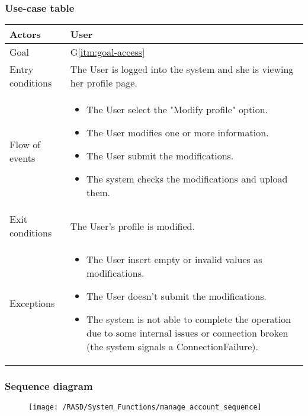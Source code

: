 \subsubsection{Use-case table}
\begin{center}
  \begin{tabular}{ l | p{10cm} }
    \hline
    Actors & User\\ \hline
    Goal & G\ref{itm:goal-access}\\ \hline
    Entry conditions & The User is logged into the system and she is viewing her profile page.   
    \\ \hline
    Flow of events &
      \begin{itemize}
        \item The User select the "Modify profile" option.
        \item The User modifies one or more information.
        \item The User submit the modifications.
        \item The system checks the modifications and upload them.
      \end{itemize} 
      \\ \hline
    Exit conditions & The User's profile is modified. \\ \hline
  Exceptions & 
\begin{itemize}
\item The User insert empty or invalid values as modifications.
\item The User doesn't submit the modifications.
\item The system is not able to complete the operation due to some internal issues or connection broken (the system signals a ConnectionFailure).%
\end{itemize} \\ \hline
  \end{tabular}
\end{center}


\subsubsection{Sequence diagram}
\begin{figure}[!ht]
  \centering
  \vspace{0.1cm}
  \texttt{[image: /RASD/System\_Functions/manage\_account\_sequence]}\\
  \vspace{0.1cm}
  \label{fig:manage_account_sequence} 
\end{figure}

